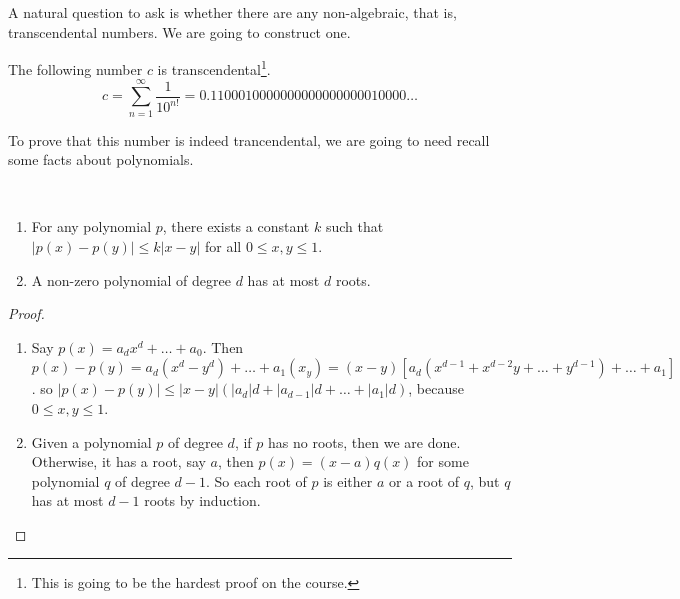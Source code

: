 \documentclass[a4paper]{scrartcl}
\begin{document}
A natural question to ask is whether there are any non-algebraic, that is, transcendental numbers.
We are going to construct one.

\begin{theorem}\label{thm:c-trancendental}
	The following number $c$ is transcendental\footnote{This is going to be the hardest proof on the course.}.
	$$
	c = \sum_{n = 1}^\infty \frac{1}{10^{n!}} = 0.1100010000000000000000010000\dots
	$$
\end{theorem}

To prove that this number is indeed trancendental, we are going to need recall some facts about polynomials.

\begin{proposition}~
	\vspace*{-1.5\baselineskip}
\begin{enumerate}[label=(\roman*)]
	\item For any polynomial $p$, there exists a constant $k$ such that $|p(x) - p(y)| \leq k|x - y|$ for all $0 \leq x, y \leq 1$.
	\item A non-zero polynomial of degree $d$ has at most $d$ roots.
\end{enumerate}
\end{proposition}
\begin{proof}$ $
	\begin{enumerate}[label=(\roman*)]
		\item Say $p(x) = a_d x^d + \dots + a_0$. Then $p(x) - p(y) = a_d(x^d - y^d) + \dots + a_1(x _ y) = (x - y)\left[a_d(x^{d - 1} + x^{d - 2}y + \dots + y^{d - 1}) + \dots + a_1\right]$.
		 so $|p(x) - p(y)| \leq |x - y| \left(|a_d|d + |a_{d - 1}|d + \dots + |a_1|d\right)$, because $0 \leq x, y \leq 1$.
		\item Given a polynomial $p$ of degree $d$, if $p$ has no roots, then we are done. Otherwise, it has a root, say $a$, then $p(x) = (x - a)q(x)$ for some polynomial $q$ of degree $d - 1$. So each root of $p$ is either $a$ or a root of $q$, but $q$ has at most $d - 1$ roots by induction. 
	\end{enumerate}
\end{proof}
\end{document}
